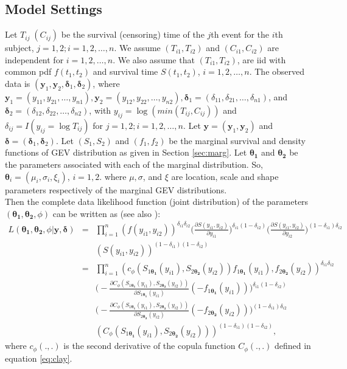 \documentclass[11pt]{article}
\theoremstyle{remboldstyle}
\newcommand{\bt}{{\boldsymbol{\theta}}}
\newcommand{\bth}{{\boldsymbol{\theta_1}}}
\newcommand{\bthe}{{\boldsymbol{\theta_2}}}
\newcommand{\y}{{\boldsymbol{y}}}
\newcommand{\oy}{{\boldsymbol{y}_{1}}}
\newcommand{\ty}{{\boldsymbol{y}_{2}}}
\newcommand{\de}{{\boldsymbol{\delta}}}
\newcommand{\ode}{{\boldsymbol{\delta}_{1}}}
\newcommand{\tde}{{\boldsymbol{\delta}_{2}}}
\begin{document}
\subsection{Model Settings}
\noindent
Let $T_{ij}\; (C_{ij})$ be the survival (censoring) time of the $j$th
event for the $i$th subject, $j=1, 2; i=1, 2,\dots, n$. We assume
$(T_{i1}, T_{i2})$ and $(C_{i1}, C_{i2})$ are independent for
$i=1, 2,\dots, n$. We also assume that $(T_{i1}, T_{i2})$, are iid
with common pdf $f(t_1, t_2)$ and survival time $S(t_1, t_2)$, $i=1, 2,\dots, n$.
The observed data is $(\oy, \ty, \ode, \tde)$, where
$\oy=(y_{11}, y_{21},\dots,y_{n1}), \ty=(y_{12}, y_{22},\dots,y_{n2}),
\ode=(\delta_{11}, \delta_{21},\dots,\delta_{n1})$, and
$\tde=(\delta_{12}, \delta_{22},\dots, \delta_{n2})$, with $y_{ij}
= \log(min (T_{ij}, C_{ij}))$ and $\delta_{ij}= I(y_{ij} = \log T_{ij})$ for
$j=1, 2; i=1, 2,\dots, n$. Let $\y =(\oy, \ty)$ and $\de =(\ode,
\tde)$.  Let $(S_1, S_2)$ and $(f_1, f_2)$ be the marginal survival
and density functions of GEV distribution as given in Section
\ref{sec:marg}.  Let $\mathbf{\bth}$ and $\mathbf{\bthe}$
be the parameters associated with each of the marginal distribution.
So, $\bt_i = (\mu_i, \sigma_i, \xi_i)$, $i = 1,2$. where $\mu,
\sigma$, and $\xi$ are location, scale and shape parameters respectively of the
marginal GEV distributions. \\ Then the complete data likelihood function (joint distribution) of the parameters $(\mathbf{\bth, \bthe}, \phi)$ can be written as (see also \cite{chen:2012}):
\begin{eqnarray}
  \label{eq:lik}
  L(\bth, \bthe, \phi | \y, \de) &=& \prod_{i=1}^n (f(y_{i1}, y_{i2}))^{\delta_{i1} \delta_{i2}}
\Big(\frac{\partial S(y_{i1}, y_{i2})}{\partial y_{i1}}\Big)^{\delta_{i1} (1- \delta_{i2})}
\Big(\frac{\partial S(y_{i1}, y_{i2})}{\partial y_{i2}}\Big)^{(1- \delta_{i1}) \delta_{i2}}
\nonumber\\
&& (S(y_{i1}, y_{i2}))^{(1-\delta_{i1}) (1-\delta_{i2})} \nonumber\\
&=& \prod_{i=1}^n (c_\phi(S_{1 \bth} (y_{i1}), S_{2 \bthe}(y_{i2})) f_{1 \bth}(y_{i1}), f_{2 \bthe}(y_{i2}))^{\delta_{i1} \delta_{i2}}\nonumber\\
&&\Big(-\frac{\partial C_\phi(S_{1 \bth} (y_{i1}), S_{2 \bthe}(y_{i2}))}{\partial S_{1 \bth} (y_{i1})}(-f_{1 \bth}(y_{i1}))\Big)^{\delta_{i1} (1- \delta_{i2})}\nonumber\\
&&
\Big(-\frac{\partial C_\phi(S_{1 \bth} (y_{i1}), S_{2 \bthe}(y_{i2}))}{\partial S_{2 \bthe} (y_{i2})}(-f_{2 \bthe}(y_{i2}))\Big)^{(1-\delta_{i1})\delta_{i2}}\nonumber\\
&&
(C_\phi(S_{1 \bth} (y_{i1}), S_{2 \bthe}(y_{i2})))^{(1-\delta_{i1}) (1-\delta_{i2})} ,
\end{eqnarray}
where $c_{\phi}(.,.)$ is the second derivative of the copula function $C_{\phi}(.,.)$ defined in equation \ref{eq:clay}.
\end{document}
